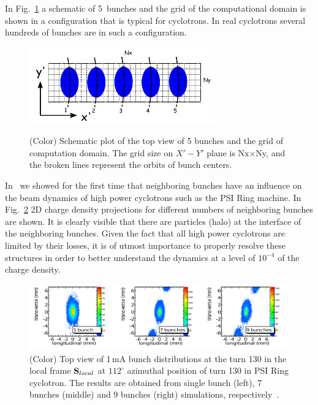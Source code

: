 \documentclass[11pt,pdftex]{article}
\begin{document}
In Fig.~\ref{fig:MultiBunch} a schematic of 5~bunches and the grid of
the computational domain is shown in a configuration that is typical for
cyclotrons.  In real cyclotrons several hundreds of bunches are in such
a configuration.
\begin{figure}[htb]
  \begin{center}
    {\includegraphics[width=8cm]{figures/SM-MultiBunch.pdf}}
    \caption{(Color) Schematic plot of the top view of 5 bunches and the
      grid of computation domain. The grid size on $X'-Y'$ plane is
      Nx$\times$Ny, and the broken lines represent the orbits of bunch
      centers. }
    \label{fig:MultiBunch}
  \end{center}
\end{figure}
In~\cite{Yangjj:3} we showed for the first time that neighboring bunches
have an influence on the beam dynamics of high power cyclotrons such as
the PSI Ring machine.  In Fig.~\ref{fig:NBcompare2D} 2D charge density
projections for different numbers of neighboring bunches are shown.  It
is clearly visible that there are particles (halo) at the interface of
the neighboring bunches.  Given the fact that all high power cyclotrons
are limited by their losses, it is of utmost importance to properly
resolve these structures in order to better understand the dynamics at a
level of $10^{-4}$ of the charge density.
\begin{figure}[htb]
  \includegraphics[width=1\linewidth]{figures/C9B7BSB-2D-1mA-130.pdf}
  \caption{(Color) Top view of 1\,mA bunch distributions at the turn 130
    in the local frame ${\mathbf S_{local}}$ at $112^\circ$ azimuthal
    position of turn 130 in PSI Ring cyclotron.  The results are
    obtained from single bunch (left), 7 bunches (middle) and 9 bunches
    (right) simulations, respectively~\cite{}.}
  \label{fig:NBcompare2D}
\end{figure}
\end{document}
